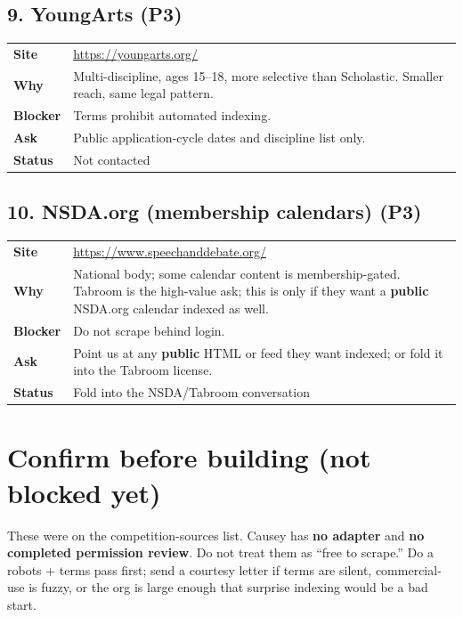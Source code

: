 \documentclass[11pt]{article}
\newcommand{\orgrow}[2]{%
  \textbf{#1} & #2 \\[0.35em]
}
\begin{document}
\subsection*{9. YoungArts (P3)}

\begin{tabularx}{\textwidth}{@{}L{2.55cm} Y@{}}
\orgrow{Site}{\url{https://youngarts.org/}}
\orgrow{Why}{Multi-discipline, ages 15--18, more selective than Scholastic. Smaller reach, same legal pattern.}
\orgrow{Blocker}{Terms prohibit automated indexing.}
\orgrow{Ask}{Public application-cycle dates and discipline list only.}
\orgrow{Status}{Not contacted}
\end{tabularx}

\subsection*{10. NSDA.org (membership calendars) (P3)}

\begin{tabularx}{\textwidth}{@{}L{2.55cm} Y@{}}
\orgrow{Site}{\url{https://www.speechanddebate.org/}}
\orgrow{Why}{National body; some calendar content is membership-gated. Tabroom is the high-value ask; this is only if they want a \textbf{public} NSDA.org calendar indexed as well.}
\orgrow{Blocker}{Do not scrape behind login.}
\orgrow{Ask}{Point us at any \textbf{public} HTML or feed they want indexed; or fold it into the Tabroom license.}
\orgrow{Status}{Fold into the NSDA/Tabroom conversation}
\end{tabularx}

\section*{Confirm before building (not blocked yet)}

These were on the competition-sources list. Causey has \textbf{no adapter} and \textbf{no completed permission review}. Do not treat them as ``free to scrape.'' Do a robots + terms pass first; send a courtesy letter if terms are silent, commercial-use is fuzzy, or the org is large enough that surprise indexing would be a bad start.
\end{document}
